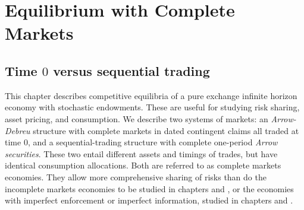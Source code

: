 
%


%


%


\chapter{Equilibrium with Complete Markets\label{recurge}}

\section{Time $0$ versus sequential trading}
 This chapter describes competitive   equilibria
of a pure exchange infinite horizon economy with stochastic
endowments.  These are  useful for studying risk sharing,
asset pricing, and consumption.       We describe two systems of markets:  an {\it Arrow-Debreu\/} structure with complete
markets in dated contingent claims all traded at time $0$,
%
 and a
sequential-trading structure with complete one-period {\it Arrow
securities\/}.
These two entail different assets  and timings of
trades, but have identical consumption allocations.
Both are referred to as complete markets
economies.  They allow more comprehensive sharing of risks
than do the incomplete markets economies to be
studied in chapters  and , or the economies
with imperfect enforcement or imperfect information, studied  in chapters
 and .




